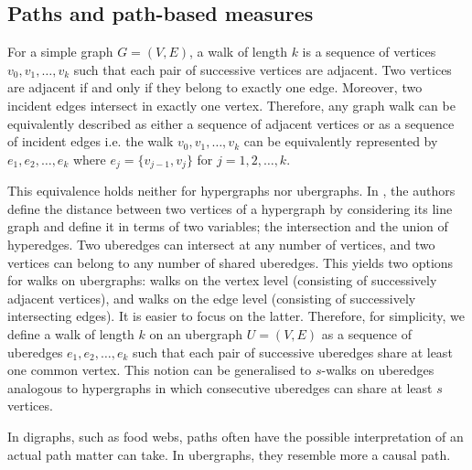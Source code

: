 \documentclass[a4paper,12pt]{article}
\theoremstyle{definition}
\newtheorem{definition}{Definition}%
\theoremstyle{remark}
\newcommand{\mwadd}[2][]{\added[id=Mwawi,comment=#1]{#2}}
\newcommand{\mU}{\mathcal{U}}
\newcommand{\EU}{E_{\mathcal{U}}}
\begin{document}
\subsection{Paths and path-based measures}
For a simple graph $G=(V,E)$, a walk of length $k$ is a sequence of vertices $v_0 , v_1, \ldots, v_k$ such that each pair of successive vertices
are adjacent. Two vertices are adjacent if and only if they belong to exactly one
edge. Moreover, two incident edges intersect in exactly one vertex. Therefore, any graph walk can be equivalently described as either a sequence of adjacent vertices or
as a sequence of incident edges i.e. the walk $v_0 , v_1, \ldots, v_k$ can be equivalently represented by $e_1 , e_2, \ldots, e_k$ where $e_j =\{v_{j-1}, v_j \}$ for $j=1,2,\ldots,k$. 

This equivalence holds neither for hypergraphs nor ubergraphs. In \cite{Vasilyeva}, the authors define the distance between two vertices of a hypergraph by considering its line graph and define it in terms of two variables; the intersection and the union of hyperedges. Two uberedges
can intersect at any number of vertices, and two vertices can belong to any number
of shared uberedges. This yields two options for walks on ubergraphs: walks on the vertex level (consisting of successively adjacent vertices), and walks on the edge level (consisting of successively intersecting edges). It is easier to focus on the latter. Therefore, for simplicity, we define a walk of length $k$ on an ubergraph $U=(V,E)$ as a sequence of uberedges $ e_1 , e_2, \ldots, e_k$ such that each pair of successive uberedges share at least one common vertex. This notion can be generalised to $s$-walks on uberedges analogous to hypergraphs \cite{Aksoy2020} in which consecutive uberedges can share at least $s$ vertices. 

In digraphs, such as food webs, paths often have the possible interpretation of an actual path matter can take. In ubergraphs, they resemble more a causal path.

\end{document}
